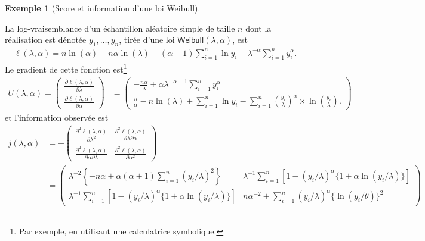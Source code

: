 \documentclass[
  11pt,
  letterpaper,
]{scrbook}
\theoremstyle{definition}
\newtheorem{example}{Exemple}[chapter]
\theoremstyle{definition}
\theoremstyle{plain}
\theoremstyle{plain}
\theoremstyle{remark}
\begin{document}
\begin{example}[Score et information d'une loi
Weibull]\protect\hypertarget{exm-weibull-emv}{}\label{exm-weibull-emv}

La log-vraisemblance d'un échantillon aléatoire simple de taille \(n\)
dont la réalisation est dénotée \(y_1, \ldots, y_n\), tirée d'une loi
\(\mathsf{Weibull}(\lambda, \alpha)\), est \begin{align*}
\ell(\lambda, \alpha) = n \ln(\alpha) - n\alpha\ln(\lambda) + (\alpha-1) \sum_{i=1}^n \ln y_i  - \lambda^{-\alpha}\sum_{i=1}^n y_i^\alpha.
\end{align*} Le gradient de cette fonction est\footnote{Par exemple, en
  utilisant une calculatrice symbolique.} \begin{align*}
U(\lambda, \alpha) = \begin{pmatrix}\frac{\partial \ell(\lambda, \alpha)}{\partial \lambda} \\
\frac{\partial \ell(\lambda, \alpha)}{\partial \alpha} \end{pmatrix} &= 
\begin{pmatrix}
 -\frac{n\alpha}{\lambda} +\alpha\lambda^{-\alpha-1}\sum_{i=1}^n y_i^\alpha
 \\
 \frac{n}{\alpha} - n \ln(\lambda) + \sum_{i=1}^n \ln y_i  - \sum_{i=1}^n \left(\frac{y_i}{\lambda}\right)^{\alpha} \times\ln\left(\frac{y_i}{\lambda}\right).
 \end{pmatrix}
\end{align*} et l'information observée est \begin{align*}
j(\lambda, \alpha) &= - \begin{pmatrix}
\frac{\partial^2 \ell(\lambda, \alpha)}{\partial \lambda^2} &  \frac{\partial^2 \ell(\lambda, \alpha)}{\partial \lambda \partial \alpha} \\ \frac{\partial^2 \ell(\lambda, \alpha)}{\partial \alpha \partial \lambda} & \frac{\partial^2 \ell(\lambda, \alpha)}{\partial \alpha^2}
\end{pmatrix} 
\\&= \begin{pmatrix}
\lambda^{-2}\left\{-n\alpha + \alpha(\alpha+1)\sum_{i=1}^n (y_i/\lambda)^2\right\} & \lambda^{-1}\sum_{i=1}^n [1-(y_i/\lambda)^\alpha\{1+\alpha\ln(y_i/\lambda)\}]\\ \lambda^{-1}\sum_{i=1}^n [1-(y_i/\lambda)^\alpha\{1+\alpha\ln(y_i/\lambda)\}]& n\alpha^{-2} + \sum_{i=1}^n (y_i/\lambda)^\alpha \{\ln(y_i/\theta)\}^2
\end{pmatrix}
\end{align*}

\end{example}
\end{document}
